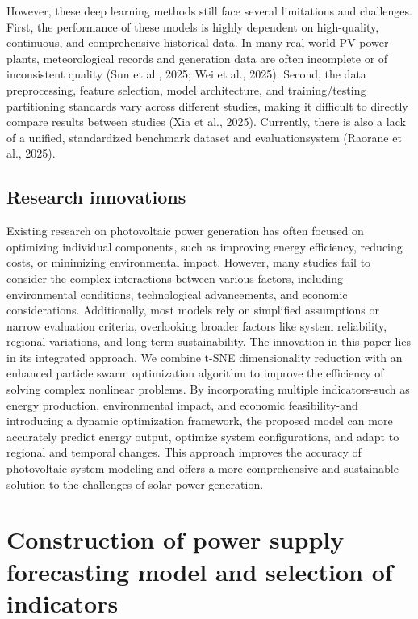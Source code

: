 \documentclass{article}
\begin{document}
	However, these deep learning methods still face several limitations and challenges. First, the performance of these models is highly dependent on high-quality, continuous, and comprehensive historical data. In many real-world PV power plants, meteorological records and generation data are often incomplete or of inconsistent quality (Sun et al., 2025; Wei et al., 2025). Second, the data preprocessing, feature selection, model architecture, and training/testing partitioning standards vary across different studies, making it difficult to directly compare results between studies (Xia et al., 2025). Currently, there is also a lack of a unified, standardized benchmark dataset and evaluationsystem (Raorane et al., 2025).
	
	\subsection{Research innovations}
	Existing research on photovoltaic power generation has often focused on optimizing individual components, such as improving energy efficiency, reducing costs, or minimizing environmental impact. However, many studies fail to consider the complex interactions between various factors, including environmental conditions, technological advancements, and economic considerations. Additionally, most models rely on simplified assumptions or narrow evaluation criteria, overlooking broader factors like system reliability, regional variations, and long-term sustainability. The innovation in this paper lies in its integrated approach. We combine t-SNE dimensionality reduction with an enhanced particle swarm optimization algorithm to improve the efficiency of solving complex nonlinear problems. By incorporating multiple indicators-such as energy production, environmental impact, and economic feasibility-and introducing a dynamic optimization framework, the proposed model can more accurately predict energy output, optimize system configurations, and adapt to regional and temporal changes. This approach improves the accuracy of photovoltaic system modeling and offers a more comprehensive and sustainable solution to the challenges of solar power generation.
	
	\section{Construction of power supply forecasting model and selection of indicators}
	
\end{document}
